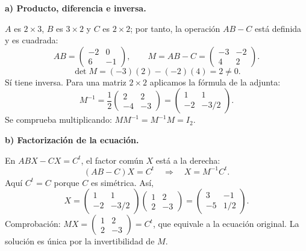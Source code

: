 \textbf{a) Producto, diferencia e inversa.}\par\nopagebreak[4]
$A$ es $2\times3$, $B$ es $3\times2$ y $C$ es $2\times2$; por tanto, la operación $AB-C$ está definida y es cuadrada:
\[
AB=\begin{pmatrix}-2&0\\6&-1\end{pmatrix},\qquad
M=AB-C=\begin{pmatrix}-3&-2\\4&2\end{pmatrix}.
\]
\[
\det M=(-3)(2)-(-2)(4)=2\ne0.
\]
Sí tiene inversa. Para una matriz $2\times2$ aplicamos la fórmula de la adjunta:
\[
\boxed{M^{-1}=\frac12\begin{pmatrix}2&2\\-4&-3\end{pmatrix}
=\begin{pmatrix}1&1\\-2&-3/2\end{pmatrix}.}
\]
Se comprueba multiplicando: $MM^{-1}=M^{-1}M=I_2$.

\textbf{b) Factorización de la ecuación.}\par\nopagebreak[4]
En $ABX-CX=C^t$, el factor común $X$ está a la derecha:
\[
(AB-C)X=C^t\quad\Longrightarrow\quad X=M^{-1}C^t.
\]
Aquí $C^t=C$ porque $C$ es simétrica. Así,
\[
\boxed{X=\begin{pmatrix}1&1\\-2&-3/2\end{pmatrix}
\begin{pmatrix}1&2\\2&-3\end{pmatrix}
=\begin{pmatrix}3&-1\\-5&1/2\end{pmatrix}.}
\]
Comprobación: $MX=\begin{pmatrix}1&2\\2&-3\end{pmatrix}=C^t$, que equivale a la ecuación original. La solución es única por la invertibilidad de $M$.
